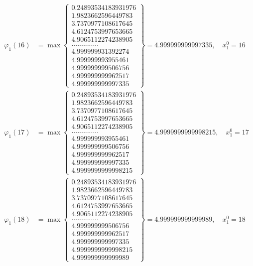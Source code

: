 \documentclass{article}
\begin{document}
\begin{align*}
  
  
  
\varphi_{1}(16) &= \max \left\{ \begin{array}{c}
0.24893534183931976 \\
 1.9823662596449783 \\
 3.7370977108617645 \\
 4.6124753997653665 \\
 4.9065112274238905 \\
 .............. \\
 4.999999931392274 \\
 4.999999993955461 \\
 4.999999999506756 \\
 4.999999999962517 \\
 4.999999999997335
\end{array} \right\} = 4.999999999997335, \quad x_{1}^0 = 16\\
  
  
  
  
\varphi_{1}(17) &= \max \left\{ \begin{array}{c}
0.24893534183931976 \\
 1.9823662596449783 \\
 3.7370977108617645 \\
 4.6124753997653665 \\
 4.9065112274238905 \\
 .............. \\
 4.999999993955461 \\
 4.999999999506756 \\
 4.999999999962517 \\
 4.999999999997335 \\
 4.9999999999998215
\end{array} \right\} = 4.9999999999998215, \quad x_{1}^0 = 17\\
  
  
  
  
\varphi_{1}(18) &= \max \left\{ \begin{array}{c}
0.24893534183931976 \\
 1.9823662596449783 \\
 3.7370977108617645 \\
 4.6124753997653665 \\
 4.9065112274238905 \\
 .............. \\
 4.999999999506756 \\
 4.999999999962517 \\
 4.999999999997335 \\
 4.9999999999998215 \\
 4.999999999999989
\end{array} \right\} = 4.999999999999989, \quad x_{1}^0 = 18\\
  

\end{align*}
\end{document}
